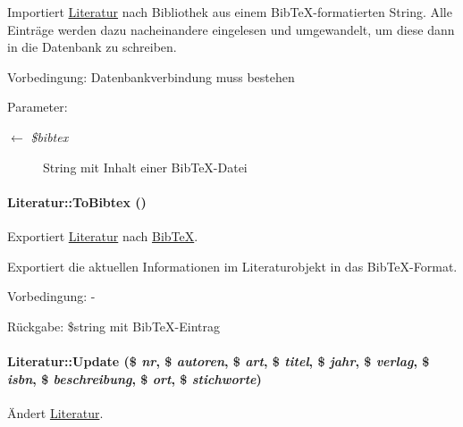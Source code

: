 Importiert \hyperlink{classLiteratur}{Literatur} nach Bibliothek aus einem Bib\-Te\-X-formatierten String. Alle Einträge werden dazu nacheinandere eingelesen und umgewandelt, um diese dann in die Datenbank zu schreiben. \begin{Desc}
\item[Vorbedingung:]Datenbankverbindung muss bestehen \end{Desc}
\begin{Desc}
\item[Parameter:]
\begin{description}
\item[\mbox{$\leftarrow$} {\em \$bibtex}]String mit Inhalt einer Bib\-Te\-X-Datei \end{description}
\end{Desc}
\hypertarget{classLiteratur_11f6d1a4409c41638ff6693f65699ff3}{
\paragraph[ToBibtex]{\setlength{\rightskip}{0pt plus 5cm}Literatur::To\-Bibtex ()}\hfill}
\label{classLiteratur_11f6d1a4409c41638ff6693f65699ff3}


Exportiert \hyperlink{classLiteratur}{Literatur} nach \hyperlink{classBibTeX}{Bib\-Te\-X}. 

Exportiert die aktuellen Informationen im Literaturobjekt in das Bib\-Te\-X-Format. \begin{Desc}
\item[Vorbedingung:]- \end{Desc}
\begin{Desc}
\item[R\"{u}ckgabe:]\$string mit Bib\-Te\-X-Eintrag \end{Desc}
\hypertarget{classLiteratur_b613c28476ea28058f8fc2bccb57c923}{
\paragraph[Update]{\setlength{\rightskip}{0pt plus 5cm}Literatur::Update (\$ {\em nr}, \$ {\em autoren}, \$ {\em art}, \$ {\em titel}, \$ {\em jahr}, \$ {\em verlag}, \$ {\em isbn}, \$ {\em beschreibung}, \$ {\em ort}, \$ {\em stichworte})}\hfill}
\label{classLiteratur_b613c28476ea28058f8fc2bccb57c923}


Ändert \hyperlink{classLiteratur}{Literatur}. 

